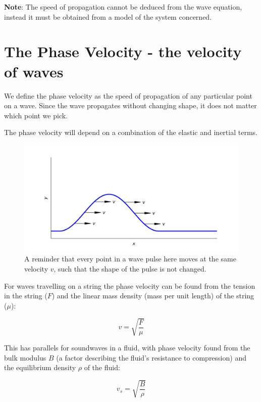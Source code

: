 \documentclass[
]{book}
\begin{document}
\textbf{Note}: The speed of propagation cannot be deduced from the wave equation, instead it must be obtained from a model of the system concerned.

\hypertarget{sec:ch6-phasevelocity}{%
\section{The Phase Velocity - the velocity of waves}\label{sec:ch6-phasevelocity}}

We define the phase velocity as the speed of propagation of any particular point on a wave. Since the wave propagates without changing shape, it does not matter which point we pick.

The phase velocity will depend on a combination of the elastic and inertial terms.

\begin{figure}

{\centering \includegraphics[width=0.7\linewidth]{visualisations/ch6-phasevelocity1} 

}

\caption{A reminder that every point in a wave pulse here moves at the same velocity $v$, such that the shape of the pulse is not changed.}\label{fig:ch6-phasevelocity1}
\end{figure}

For waves travelling on a string the phase velocity can be found from the tension in the string (\(F\)) and the linear mass density (mass per unit length) of the string (\(\mu\)):

\begin{equation}
v = \sqrt{\frac{F}{\mu}}
\end{equation}

This has parallels for soundwaves in a fluid, with phase velocity found from the bulk modulus \(B\) (a factor describing the fluid's resistance to compression) and the equilibrium density \(\rho\) of the fluid:

\begin{equation}
v_s = \sqrt{\frac{B}{\rho}}
\end{equation}
\end{document}
